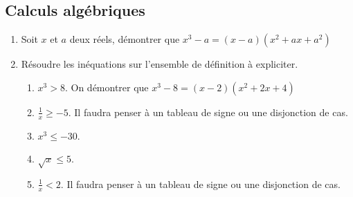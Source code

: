 \documentclass[10pt]{article}
\begin{document}
\subsection*{Calculs algébriques} 

\begin{enumerate}
\item Soit $x$ et $a$ deux réels, démontrer que $x^3-a=(x-a)(x^2+ax+a^2)$
\item Résoudre les inéquations sur l'ensemble de définition à expliciter. 
\begin{enumerate}
\item $x^3>8$. On démontrer que $x^3-8=(x-2)(x^2+2x+4)$
\item $\frac{1}{x} \geq -5$. Il faudra penser à un tableau de signe ou une disjonction de cas.
\item $x^3 \leq -30$.  
\item $\sqrt{x}\leq 5$.
\item $\frac{1}{x}<2$. Il faudra penser à un tableau de signe ou une disjonction de cas.
\end{enumerate} 
\end{enumerate}
\end{document}
